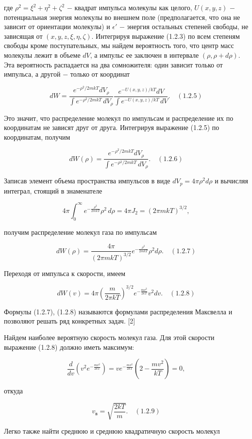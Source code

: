 где $\rho^2=\xi^2 + \eta^2 + \zeta^2$ $-$ квадрат импульса молекулы как целого, $U(x, y, z)$ $-$ потенциальная энергия молекулы во внешнем поле (предполагается, что она не зависит от ориентации молекулы) и $\epsilon'$ $-$ энергия остальных степеней свободы, не зависящая от $(x, y, z,\xi,\eta, \zeta)$. Интегрируя выражение (1.2.3) по всем степеням свободы кроме поступательных, мы найдем вероятность того, что центр масс молекулы лежит в объеме $dV$, а импульс ее заключен в интервале $(\rho, \rho +d \rho)$. Эта вероятность распадается на два сомножителя: один зависит только от импульса, а другой $-$ только от координат

$$ dW= \frac{e^{- \rho^2/2mkT}dV_\rho}{\int e^{- \rho^2/2mkT}\, dV_\rho} \frac{e^{- U(x,y,z)/kT}dV}{\int e^{- U(x,y,z)/kT}\, dV}.\quad (1.2.5)$$

Это значит, что распределение молекул по импульсам и распределение их по координатам не зависят друг от друга. Интегрируя выражение (1.2.5) по координатам, получим

$$ dW(\rho)= \frac{e^{- \rho^2/2mkT}dV_\rho}{\int e^{- \rho^2/2mkT}\, dV_\rho}.\quad (1.2.6)$$

Записав элемент объема пространства импульсов в виде $dV_p = 4\pi\rho^2d\rho$ и вычисляя интеграл, стоящий в знаменателе

$$4\pi \int_{0}^{\infty} e^{-\frac{\rho^2}{2mkT}}\rho^2\, d\rho = 4\pi J_2 =(2\pi mkT)^{3/2},$$

получим распределение молекул газа по импульсам

$$ dW(\rho)= \frac{4\pi}{(2\pi mkT)^{3/2}} e^{-\frac{\rho^2}{2mkT}}\rho^2 d\rho.\quad (1.2.7)$$

Переходя от импульса к скорости, имеем

$$ dW(v)= 4\pi \left(\frac{m}{2\pi kT}\right)^{3/2} e^{-\frac{mv^2}{2kT}}v^2 dv.\quad (1.2.8)$$

Формулы (1.2.7), (1.2.8) называются формулами распределения Максвелла и позволяют решать ряд конкретных задач. [2]

Найдем наиболее вероятную скорость молекул газа. Для этой скорости выражение (1.2.8) должно иметь максимум:

$$\frac{d}{dv}\left(v^2e^{-\frac{mv^2}{2kT}}\right)=ve^{-\frac{mv^2}{2kT}}\left( 2 - \frac{mv^2}{kT}\right)=0,$$

откуда

$$v_\text{в}=\sqrt{\frac{2kT}{m}}.\quad (1.2.9)$$

Легко также найти среднюю и среднюю квадратичную скорость молекул

